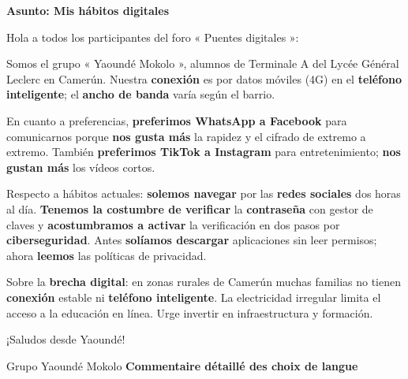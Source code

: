 \documentclass[11pt]{article}
\begin{document}
\begin{exoresolu}
\textbf{Asunto: Mis hábitos digitales}

Hola a todos los participantes del foro « Puentes digitales »:

Somos el grupo « Yaoundé Mokolo », alumnos de Terminale A del Lycée Général Leclerc en Camerún. Nuestra \textbf{conexión} es por datos móviles (4G) en el \textbf{teléfono inteligente}; el \textbf{ancho de banda} varía según el barrio.

En cuanto a preferencias, \textbf{preferimos WhatsApp a Facebook} para comunicarnos porque \textbf{nos gusta más} la rapidez y el cifrado de extremo a extremo. También \textbf{preferimos TikTok a Instagram} para entretenimiento; \textbf{nos gustan más} los vídeos cortos.

Respecto a hábitos actuales: \textbf{solemos navegar} por las \textbf{redes sociales} dos horas al día. \textbf{Tenemos la costumbre de verificar} la \textbf{contraseña} con gestor de claves y \textbf{acostumbramos a activar} la verificación en dos pasos por \textbf{ciberseguridad}. Antes \textbf{solíamos descargar} aplicaciones sin leer permisos; ahora \textbf{leemos} las políticas de privacidad.

Sobre la \textbf{brecha digital}: en zonas rurales de Camerún muchas familias no tienen \textbf{conexión} estable ni \textbf{teléfono inteligente}. La electricidad irregular limita el acceso a la educación en línea. Urge invertir en infraestructura y formación.

¡Saludos desde Yaoundé!

Grupo Yaoundé Mokolo
\tcblower
\textbf{Commentaire détaillé des choix de langue}


\end{exoresolu}
\end{document}
